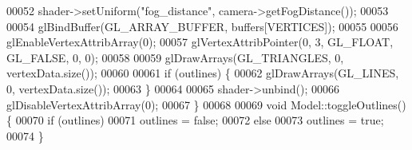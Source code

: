 \begin{DoxyCode}
00052     shader->setUniform(\textcolor{stringliteral}{"fog\_distance"}, camera->getFogDistance());
00053 
00054     glBindBuffer(GL\_ARRAY\_BUFFER, buffers[VERTICES]);
00055 
00056     glEnableVertexAttribArray(0);
00057     glVertexAttribPointer(0, 3, GL\_FLOAT, GL\_FALSE, 0, 0);
00058 
00059     glDrawArrays(GL\_TRIANGLES, 0, vertexData.size());
00060 
00061     \textcolor{keywordflow}{if} (outlines) \{
00062         glDrawArrays(GL\_LINES, 0, vertexData.size());
00063     \}
00064 
00065     shader->unbind();
00066     glDisableVertexAttribArray(0);
00067 \}
00068 
00069 \textcolor{keywordtype}{void} Model::toggleOutlines() \{
00070     \textcolor{keywordflow}{if} (outlines) 
00071         outlines = \textcolor{keyword}{false};
00072     \textcolor{keywordflow}{else}
00073         outlines = \textcolor{keyword}{true};
00074 \}
\end{DoxyCode}

